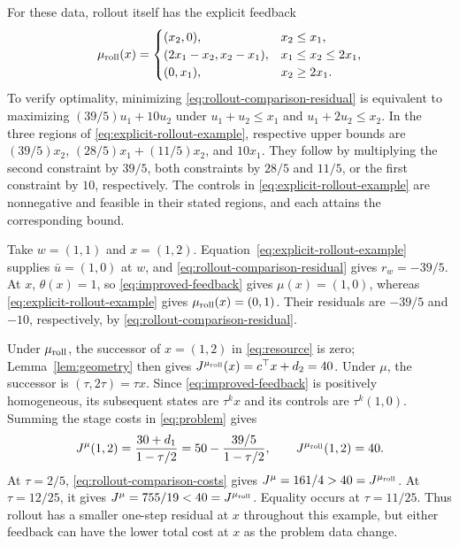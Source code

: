 \documentclass[10pt]{article}
\begin{document}
For these data, rollout itself has the explicit feedback
\begin{equation}
 \mu_{\rm roll}(x)=
 \begin{cases}
  (x_2,0),&x_2\le x_1,\\
  (2x_1-x_2,x_2-x_1),&x_1\le x_2\le2x_1,\\
  (0,x_1),&x_2\ge2x_1.
 \end{cases}
 \label{eq:explicit-rollout-example}
\end{equation}
To verify optimality, minimizing \eqref{eq:rollout-comparison-residual} is equivalent to maximizing $(39/5)u_1+10u_2$ under $u_1+u_2\le x_1$ and $u_1+2u_2\le x_2$. In the three regions of \eqref{eq:explicit-rollout-example}, respective upper bounds are $(39/5)x_2$, $(28/5)x_1+(11/5)x_2$, and $10x_1$. They follow by multiplying the second constraint by $39/5$, both constraints by $28/5$ and $11/5$, or the first constraint by $10$, respectively. The controls in \eqref{eq:explicit-rollout-example} are nonnegative and feasible in their stated regions, and each attains the corresponding bound.

Take $w=(1,1)$ and $x=(1,2)$. Equation~\eqref{eq:explicit-rollout-example} supplies $\bar u=(1,0)$ at $w$, and \eqref{eq:rollout-comparison-residual} gives $r_w=-39/5$. At $x$, $\theta(x)=1$, so \eqref{eq:improved-feedback} gives $\mu(x)=(1,0)$, whereas \eqref{eq:explicit-rollout-example} gives $\mu_{\rm roll}(x)=(0,1)$. Their residuals are $-39/5$ and $-10$, respectively, by \eqref{eq:rollout-comparison-residual}.

Under $\mu_{\rm roll}$, the successor of $x=(1,2)$ in \eqref{eq:resource} is zero; Lemma~\ref{lem:geometry} then gives $J^{\mu_{\rm roll}}(x)=c^\top x+d_2=40$. Under $\mu$, the successor is $(\tau,2\tau)=\tau x$. Since \eqref{eq:improved-feedback} is positively homogeneous, its subsequent states are $\tau^k x$ and its controls are $\tau^k(1,0)$. Summing the stage costs in \eqref{eq:problem} gives
\begin{equation}
 J^\mu(1,2)=\frac{30+d_1}{1-\tau/2}
 =50-\frac{39/5}{1-\tau/2},
 \qquad J^{\mu_{\rm roll}}(1,2)=40.
 \label{eq:rollout-comparison-costs}
\end{equation}
At $\tau=2/5$, \eqref{eq:rollout-comparison-costs} gives $J^\mu=161/4>40=J^{\mu_{\rm roll}}$. At $\tau=12/25$, it gives $J^\mu=755/19<40=J^{\mu_{\rm roll}}$. Equality occurs at $\tau=11/25$. Thus rollout has a smaller one-step residual at $x$ throughout this example, but either feedback can have the lower total cost at $x$ as the problem data change.
\end{document}
